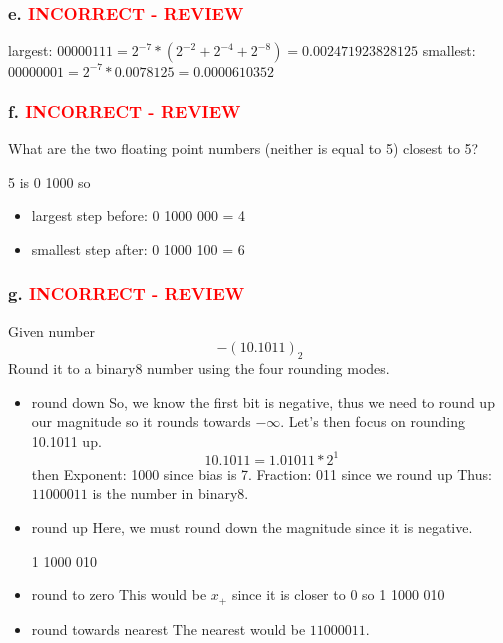 \documentclass[12pt,a4paper]{article}
\begin{document}
\subsubsection*{e. \textcolor{red}{INCORRECT - REVIEW}} 
largest: $0 0000 111 =2^{-7} * (2^{-2} + 2^{-4} + 2^{-8}) = 0.002471923828125 $
\newline
smallest: $0 0000 001 = 2^{-7} * 0.0078125 = {0.0000610352}$

\subsubsection*{f. \textcolor{red}{INCORRECT - REVIEW}}

What are the two floating point numbers (neither is equal to 5) closest to 5?

5 is 0 1000 so
\begin{itemize}
	\item largest step before: 0 1000 000 = 4
	\item smallest step after: 0 1000 100 = 6
\end{itemize}

\subsubsection*{g. \textcolor{red}{INCORRECT - REVIEW}}
Given number $$-(10.1011)_2$$
Round it to a binary8 number using the four rounding modes.

\begin{itemize}
    \item round down \newline
        So, we know the first bit is negative, thus we need to round up our magnitude so it rounds towards $- \infty$. Let's then focus on rounding 10.1011 up. 
        $$10.1011 = 1.01011 * 2^1$$
        then \newline Exponent: 1000 since bias is 7. \newline 
        Fraction: 011 since we round up \newline 
        Thus: $1 1000 011$ is the number in binary8.
    \item round up \newline
        Here, we must round down the magnitude since it is negative.

        1 1000 010
    \item round to zero\newline
        This would be $x_+$ since it is closer to 0 so 1 1000 010
    \item round towards nearest\newline
        The nearest would be $1 1000 011$.
\end{itemize}
\end{document}
